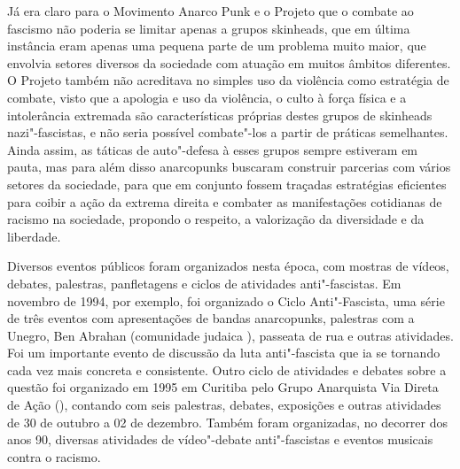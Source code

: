 Já era claro para o Movimento Anarco Punk e o Projeto  que o combate ao fascismo não poderia se limitar apenas a grupos skinheads, que em última instância eram apenas uma pequena parte de um problema muito maior, que envolvia setores diversos da sociedade com atuação em muitos âmbitos diferentes. O Projeto  também não acreditava no simples uso da violência como estratégia de combate, visto que a apologia e uso da violência, o culto à força física e a intolerância extremada são características próprias destes grupos de skinheads nazi"-fascistas, e não seria possível combate"-los a partir de práticas semelhantes. Ainda assim, as táticas de auto"-defesa à esses grupos sempre estiveram em pauta, mas para além disso anarcopunks buscaram construir parcerias com vários setores da sociedade, para que em conjunto fossem traçadas estratégias eficientes para coibir a ação da extrema direita e combater as manifestações cotidianas de racismo na sociedade, propondo o respeito, a valorização da diversidade e da liberdade.

Diversos eventos públicos foram organizados nesta época, com mostras de vídeos, debates, palestras, panfletagens e ciclos de atividades anti"-fascistas. Em novembro de 1994, por exemplo, foi organizado o Ciclo Anti"-Fascista, uma série de três eventos com apresentações de bandas anarcopunks, palestras com a Unegro, Ben Abrahan (comunidade judaica ), passeata de rua e outras atividades. Foi um importante evento de discussão da luta anti"-fascista que ia se tornando cada vez mais concreta e consistente.  Outro ciclo de atividades e debates sobre a questão foi organizado em 1995 em Curitiba pelo Grupo Anarquista Via Direta de Ação (), contando com seis palestras, debates, exposições e outras atividades de 30 de outubro a 02 de dezembro. Também foram organizadas, no decorrer dos anos 90, diversas atividades de vídeo"-debate anti"-fascistas e eventos musicais contra o racismo.

